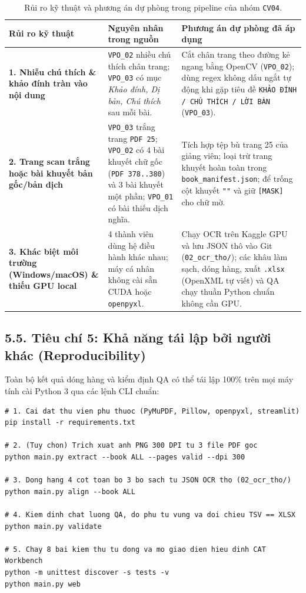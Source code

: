 \documentclass[11pt,a4paper]{article}
\begin{document}
\vspace{0.15em}
\begin{table}[h!]
\centering
\small
\begin{tabular}{L{3.8cm} L{4.8cm} L{6.5cm}}
\toprule
\textbf{Rủi ro kỹ thuật} & \textbf{Nguyên nhân trong nguồn} & \textbf{Phương án dự phòng đã áp dụng} \\
\midrule
\textbf{1. Nhiễu chú thích \& khảo đính tràn vào nội dung} &
\texttt{VPO\_02} nhiều chú thích chân trang; \texttt{VPO\_03} có mục \textit{Khảo đính, Dị bản, Chú thích} sau mỗi bài. &
Cắt chân trang theo đường kẻ ngang bằng OpenCV (\texttt{VPO\_02}); dùng regex không dấu ngắt tự động khi gặp tiêu đề \texttt{KHẢO ĐÍNH / CHÚ THÍCH / LỜI BÀN} (\texttt{VPO\_03}). \\
\addlinespace[0.25em]
\textbf{2. Trang scan trắng hoặc bài khuyết bản gốc/bản dịch} &
\texttt{VPO\_03} trắng trang \texttt{PDF 25}; \texttt{VPO\_02} có 4 bài khuyết chữ gốc (\texttt{PDF 378..380}) và 3 bài khuyết một phần; \texttt{VPO\_01} có bài thiếu dịch nghĩa. &
Tích hợp tệp bù trang 25 của giảng viên; loại trừ trang khuyết hoàn toàn trong \texttt{book\_manifest.json}; để trống cột khuyết \texttt{""} và giữ \texttt{[MASK]} cho chữ mờ. \\
\addlinespace[0.25em]
\textbf{3. Khác biệt môi trường (Windows/macOS) \& thiếu GPU local} &
4 thành viên dùng hệ điều hành khác nhau; máy cá nhân không cài sẵn CUDA hoặc \texttt{openpyxl}. &
Chạy OCR trên Kaggle GPU và lưu JSON thô vào Git (\texttt{02\_ocr\_tho/}); các khâu làm sạch, dóng hàng, xuất \texttt{.xlsx} (OpenXML tự viết) và QA chạy thuần Python chuẩn không cần GPU. \\
\bottomrule
\end{tabular}
\caption{Rủi ro kỹ thuật và phương án dự phòng trong pipeline của nhóm \texttt{CV04}.}
\end{table}

\subsection{5.5. Tiêu chí 5: Khả năng tái lập bởi người khác (Reproducibility)}

Toàn bộ kết quả dóng hàng và kiểm định QA có thể tái lập 100\% trên mọi máy tính cài Python 3 qua các lệnh CLI chuẩn:

\begin{lstlisting}[style=customc]
# 1. Cai dat thu vien phu thuoc (PyMuPDF, Pillow, openpyxl, streamlit)
pip install -r requirements.txt

# 2. (Tuy chon) Trich xuat anh PNG 300 DPI tu 3 file PDF goc
python main.py extract --book ALL --pages valid --dpi 300

# 3. Dong hang 4 cot toan bo 3 bo sach tu JSON OCR tho (02_ocr_tho/)
python main.py align --book ALL

# 4. Kiem dinh chat luong QA, do phu tu vung va doi chieu TSV == XLSX
python main.py validate

# 5. Chay 8 bai kiem thu tu dong va mo giao dien hieu dinh CAT Workbench
python -m unittest discover -s tests -v
python main.py web
\end{lstlisting}
\end{document}
